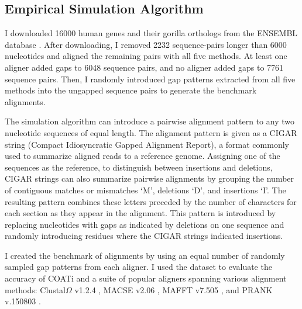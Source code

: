 \subsection*{Empirical Simulation Algorithm}

I downloaded 16000 human genes and their gorilla orthologs from the ENSEMBL
database \citep{ensembl_hubbard_2002}.
After downloading, I removed 2232 sequence-pairs longer than 6000 nucleotides and aligned the remaining pairs with all five methods.
At least one aligner added gaps to 6048 sequence pairs, and no aligner added gaps to 7761 sequence pairs.
Then, I randomly introduced gap patterns extracted from all five methods into the ungapped sequence pairs to generate the benchmark alignments.

The simulation algorithm can introduce a pairwise alignment pattern to any two nucleotide sequences of equal length. The alignment pattern is given as a CIGAR string (Compact Idiosyncratic Gapped Alignment Report), a format commonly used to summarize aligned reads to a reference genome. Assigning one of the sequences as the reference, to distinguish between insertions and deletions, CIGAR strings can also summarize pairwise alignments by grouping the number of contiguous matches or mismatches `M', deletions `D', and insertions `I'. The resulting pattern combines these letters preceded by the number of characters for each section as they appear in the alignment. This pattern is introduced by replacing nucleotides with gaps as indicated by deletions on one sequence and randomly introducing residues where the CIGAR strings indicated insertions.


I created the benchmark of alignments by using an equal number of randomly sampled gap patterns from each aligner.
I used the dataset to evaluate the accuracy of COATi and a suite of popular aligners spanning various alignment methods:
Clustal$\Omega$ v1.2.4 \citep{clustal_omega_sievers_2011},
MACSE v2.06 \citep{ranwez_macse_2011}, MAFFT v7.505
\citep{katoh2013mafft}, and PRANK v.150803 \citep{prank_loytynoja_2014}.


